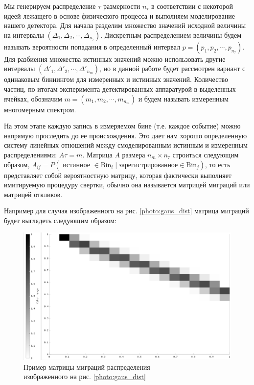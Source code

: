 \documentclass[a4paper,12pt]{diplom}
\begin{document}
Мы генерируем распределение $\tau$ размерности $n_{\tau}$ в соответствии с некоторой идеей лежащего в основе физического процесса и 
выполняем моделирование нашего детектора. Для начала разделим множество значений исходной величины на интервалы 
$(\Delta_{1}, \Delta_{2}, \cdots ,\Delta_{n_{\tau}})$. Дискретным распределением величины будем называть вероятности попадания 
в определенный интервал $p = (p_{1}, p_{2}, \cdots, p_{n_{\tau}})$. Для разбиения множества истинных значений можно использовать 
другие интервалы $(\Delta'_{1}, \Delta'_{2}, \cdots ,\Delta'_{n_{m}})$, но в данной работе будет рассмотрен вариант с одинаковым 
биннингом для измеренных и истинных значений. Количество частиц, по итогам эксперимента детектированных аппаратурой в выделенных 
ячейках, обозначим $m = (m_{1}, m_{2}, \cdots, m_{n_{m}})$ и будем называть измеренным многомерным спектром. 


На этом этапе каждую запись в измеряемом бине (т.е. каждое событие) можно напрямую проследить до ее происхождения. 
Это дает нам хорошо определенную систему линейных отношений между смоделированным истинным и измеренным распределениями: 
$A\tau = m$. Матрица $A$ размера $n_{m} \times n_{\tau}$ строиться следующим образом, 
$A_{ij} = P( \text{ истинное } \in \text{Bin}_{i} \mid \text{зарегистрированное} \in \text{Bin}_{j} )$, 
то есть представляет собой вероятностную матрицу, которая фактически выполняет имитируемую процедуру свертки, обычно она называется матрицей
миграций или матрицей откликов.

Например для случая изображенного на рис. \eqref{photo:gaus_dist} матрица миграций будет выглядеть следующим образом:

\begin{figure}[h]
   \includegraphics[width=\linewidth]{images/gaus_mig_black.png}
   \caption{Пример матрицы миграций распределения \\ изображенного на рис. \eqref{photo:gaus_dist} }
   \label{photo:gaus_mig}
\end{figure}
\end{document}
